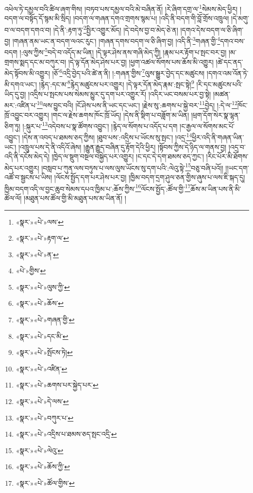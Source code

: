 འཕེལ་ཏེ་དམྱལ་བའི་ཚིལ་ཞག་གིས། །བཏབ་པས་དམྱལ་བའི་མེ་བཞིན་ནོ། །རེ་ཞིག་དགྲ་ལ་\footnote{«སྣར་»«པེ་»ལས་}སེམས་མེད་ཕྱིར། །བདག་ལ་བསྟོད་དོ་སྙམ་མི་སྲིད། །བདག་ལ་གཞན་དགའ་གྲགས་སྙམ་པ། །འདི་ནི་བདག་གི་བློ་གྲོས་འཁྲུལ། །དེ་མགུ་བ་ལ་བདག་དགའ་བ། །དེ་ནི་:རྟག་ཏུ་\footnote{«སྣར་»«པེ་»རྟག་ལ་}སྤྱིར་འགྱུར་མོད། །དེ་བདེས་བྱ་བ་མེད་ཅེ་ན། །དགའ་དེས་བདག་ལ་ཅི་ཞིག་བྱ། །གཞན་ནམ་ཡང་ན་བདག་ལའང་རུང་། །གཞན་དགས་བདག་ལ་ཅི་ཞིག་བྱ། །འདི་ནི་\footnote{«སྣར་»«པེ་»ན་}གཞན་གྱི་\footnote{«པེ་»གྱིས་}དགའ་བས་བདག །:ལུས་ཀྱིས་\footnote{«སྣར་»«པེ་»ལུས་ཀྱི་}བདེ་བ་འདོད་མ་ཡིན། །དེ་ལྟར་ཤེས་ནས་གཞི་མེད་ཀྱི། །རྣམ་པར་རྟོག་པ་སྤང་བར་བྱ། །མ་གྲགས་སྨད་དང་མ་བཀུར་བ། །དེ་ལྟ་དོན་མེད་ཤེས་པར་བྱ། །ཕྱག་འཚལ་སོགས་པས་ཆོས་མི་འགྱུར། །ཚེ་དང་ནད་མེད་སྟོབས་མི་འགྱུར། །ཅོ་\footnote{«སྣར་»«པེ་»ཆོས་}འདྲི་བྱེད་པའི་ཚེ་ན་ནི། །:གཞན་གྱིས་\footnote{«སྣར་»«པེ་»གཞན་གྱི་}ལུས་སྒྱུར་བྱེད་དང་མཚུངས། །དགའ་འམ་འོན་ཏེ་མི་དགའ་ཡང་། །རྙེད་:དང་མ་\footnote{«སྣར་»«པེ་»དང་མི་}རྙེད་མཚུངས་པར་འགྱུར། །དེ་ལྟར་དོན་མེད་རྣམ་:སྤང་སྟེ།\footnote{«སྣར་»«པེ་»སྤོངས་ཏེ།} །རི་དང་མཚུངས་པའི་ཡིད་དུ་བྱ། །འདྲིས་པ་སྤངས་པས་སེམས་མྱུར་དུ་དག་པར་འགྱུར་རོ། །འདིར་ཡང་བསམ་པར་བྱ་སྟེ། །མཚན་མར་:འཛིན་པ་\footnote{«སྣར་»«པེ་»འཛིན་}ལས་བྱུང་བའི། །ངོ་ཤེས་པས་ནི་ཡང་དང་ཡང་། །རྗེས་སུ་:ཆགས་པ་སྐྱེ་བར་\footnote{«སྣར་»«པེ་»ཆགས་པར་སྐྱེད་པར་}བྱེད། །:དེ་ལ་\footnote{«སྣར་»«པེ་»དེ་ལས་}ཁོང་ཁྲོ་འབྱུང་བར་འགྱུར། །གང་ལ་རྗེས་ཆགས་ཁོང་ཁྲོ་ཡོད། །དེས་ནི་སྡིག་པ་བཟློག་མ་ཡིན། །ཕྲག་དོག་སེར་སྣ་ལྷན་ཅིག་ཏུ། །:སྐུར་པ་\footnote{«སྣར་»«པེ་»བཀུར་པ་}འདེབས་པ་སྣ་ཚོགས་འབྱུང་། །རྙེད་ལ་སོགས་པ་འདོད་པ་དག །ང་རྒྱལ་ལ་སོགས་མང་པོ་འབྱུང་། །དེས་ན་འབད་པ་ཐམས་ཅད་ཀྱིས། །ཐུབ་པས་:འདྲིས་པ་ཡོངས་སུ་སྤང་། །འདྲ་\footnote{«སྣར་»«པེ་»འདྲིས་པ་ཐམས་ཅད་སྤང་འདྲི་}ཕྱིར་འདི་ནི་གཞན་ཡིན་ཡང་། །འཁྲུལ་པས་དེ་ནི་འདིའོ་ཞེས། །རྒྱུན་རྒྱུད་བཞིན་དུ་རྟོག་དེའི་ཕྱིར། །སྟོབས་ཀྱིས་དེ་ཉིད་ལ་གནས་བྱ། །འདྲ་བ་འདི་ནི་དངོས་མེད་དེ། །ཁྱེད་ལ་སྡུག་བསྔལ་བསྐྱེད་པར་འགྱུར། །ང་དང་དེ་དག་ཐམས་ཅད་ཀྱང་། །རིང་པོར་མི་ཐོགས་མེད་པར་འགྱུར། །བསླབ་པ་ཀུན་ལས་བཏུས་པ་ལས་ལུས་ཡོངས་སུ་དག་པའི་:ལེའུ་སྟེ་\footnote{«སྣར་»«པེ་»ལེའུ་}བཅུ་བཞི་པའོ།། །།ཡང་དག་འཚོ་བ་སྦྱངས་པ་ཡིས། །ལོངས་སྤྱོད་དག་པར་ཤེས་པར་བྱ། །ཁྱིམ་བདག་དྲག་ཤུལ་ཅན་གྱིས་ཞུས་པ་ལས་ཇི་སྐད་དུ། ཁྱིམ་བདག་འདི་ལ་བྱང་ཆུབ་སེམས་དཔའ་ཁྱིམ་པ་:ཆོས་ཀྱིས་\footnote{«སྣར་»«པེ་»ཆོས་ཀྱི་}ལོངས་སྤྱོད་:ཚོལ་གྱི་\footnote{«སྣར་»«པེ་»ཚོལ་གྱིས་}ཆོས་མ་ཡིན་པས་ནི་མི་ཚོལ་ལོ། །མཐུན་པས་ཚོལ་གྱི་མི་མཐུན་པས་མ་ཡིན་ནོ། །
